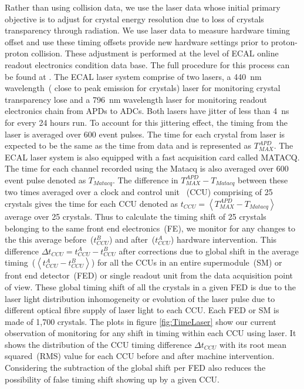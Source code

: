 Rather than using collision data, we use the laser data whose initial primary objective is to adjust for crystal energy resolution due to loss of crystals transparency through radiation. 
We use laser data to measure hardware timing offset and use these timing offsets provide new hardware settings prior to proton-proton collision. These adjustment is performed at the level of ECAL online readout electronics condition data base. The full procedure for this process can be found at \cite{LaserTiming}. The ECAL laser system comprise of two lasers, a 440~nm wavelength~( close to peak emission for \pb crystals) laser for monitoring crystal transparency lose and a 796~nm wavelength laser for monitoring readout electronics chain from APDs to ADCs. Both lasers have jitter of less than 4~ns for every 24 hours run. To account for this jittering effect, the timing from the laser is averaged over 600 event pulses. The time for each crystal from laser is expected to be the same as the time from data and is represented as $T^{APD}_{MAX} $. The ECAL laser system is also equipped with a fast acquisition card called MATACQ. The time for each channel recorded using the Matacq is also averaged over 600 event pulse denoted as $ T_{Matacq}$.
The difference in $ T^{APD}_{MAX} - T_{Matacq} $ between these two times averaged over a clock and control unit ~(CCU) comprising of 25 crystals gives the time for each CCU denoted as $ t_{CCU} = \left\langle T^{APD}_{MAX} - T_{Matacq} \right\rangle $ average over 25 crystals.
Thus to calculate the timing shift of 25 crystals belonging to the same front end electronics~(FE), we monitor for any changes to the this average before~($t^{B}_{CCU} $) and after~($t^{A}_{CCU} $) hardware intervention.  This difference $\Delta t_{CCU} = t^{A}_{CCU} - t^{B}_{CCU} $ after corrections due to global shift in the average timing~($\left\langle t^{A}_{CCU} - t^{B}_{CCU} \right\rangle $) for all the CCUs in an entire supermodule~(SM) or front end detector~(FED) or single readout unit from the data acquisition point of view. These global timing shift of all the crystals in a given FED is due to the laser light distribution inhomogeneity or evolution of the laser pulse due to different optical fibre supply of laser light to each CCU. Each FED or SM is made of 1,700 \pb crystals. 
The plots in figure \ref{fig:TimeLaser} show our current observation of  monitoring for any shift in timing within each CCU using laser. It shows the distribution of the CCU timing difference $ \Delta t_{CCU}$ with its root mean squared~(RMS) value for each CCU before and after machine intervention. Considering the subtraction of the global shift per FED also reduces the possibility of false timing shift showing up by a given CCU.

